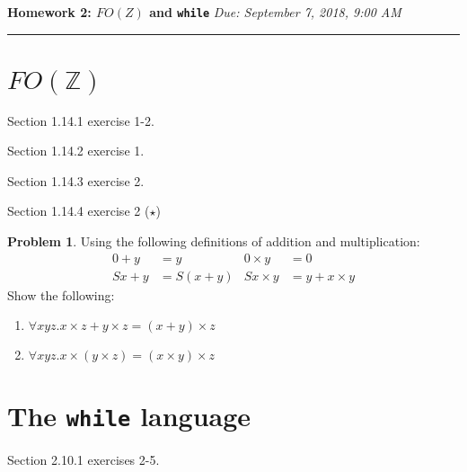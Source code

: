 \documentclass[10pt]{article}
\theoremstyle{definition}
\newtheorem{prob}{Problem}
\begin{document}
\noindent
\textbf{Homework 2: $FO(Z)$ and \texttt{while}} \hfill \emph{Due: September 7, 2018, 9:00 AM}
\hrule

\vspace{.3in}

\section*{$FO(\mathbb Z)$}

Section 1.14.1 exercise 1-2.

Section 1.14.2 exercise 1.

Section 1.14.3 exercise 2.

Section 1.14.4 exercise 2 ($\star$)

\begin{prob}
  Using the following definitions of addition and multiplication:
  \begin{align*}
    0 + y &= y & 0 \times y &= 0 \\
    Sx + y &= S(x + y) & Sx \times y &= y + x \times y
  \end{align*}
  Show the following:
  \begin{enumerate}[label=(\alph*)]
  \item $\forall x y z. x \times z + y \times z = (x + y) \times z$
  \item $\forall x y z. x \times (y \times z) = (x \times y) \times z$
  \end{enumerate}
\end{prob}

\section*{The \texttt{while} language}

Section 2.10.1 exercises 2-5.
\end{document}
